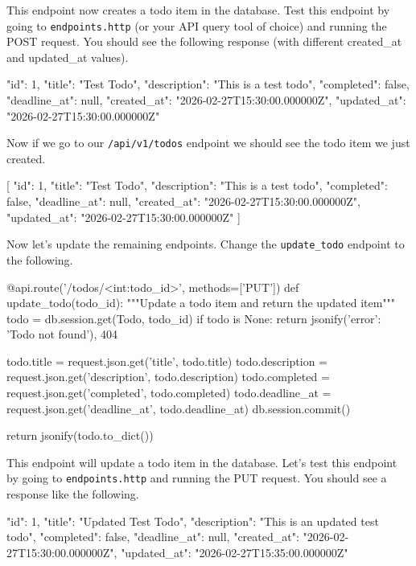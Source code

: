 \documentclass{csse4400}
\begin{document}
This endpoint now creates a todo item in the database.
Test this endpoint by going to \texttt{endpoints.http} (or your API query tool of choice) and running the POST request.
You should see the following response (with different created\_at and updated\_at values).

\begin{code}[language=json,numbers=none]{}
  {
    "id": 1,
    "title": "Test Todo",
    "description": "This is a test todo",
    "completed": false,
    "deadline_at": null,
    "created_at": "2026-02-27T15:30:00.000000Z",
    "updated_at": "2026-02-27T15:30:00.000000Z"
  }
\end{code}

Now if we go to our \texttt{/api/v1/todos} endpoint we should see the todo item we just created.

\begin{code}[language=json,numbers=none]{}
  [
    {
      "id": 1,
      "title": "Test Todo",
      "description": "This is a test todo",
      "completed": false,
      "deadline_at": null,
      "created_at": "2026-02-27T15:30:00.000000Z",
      "updated_at": "2026-02-27T15:30:00.000000Z"
    }
  ]
\end{code}

Now let's update the remaining endpoints.
Change the \texttt{update\_todo} endpoint to the following.

\begin{code}[language=python,numbers=none]{}
@api.route('/todos/<int:todo_id>', methods=['PUT'])
def update_todo(todo_id):
    """Update a todo item and return the updated item"""
    todo = db.session.get(Todo, todo_id)
    if todo is None:
        return jsonify({'error': 'Todo not found'}), 404

    todo.title = request.json.get('title', todo.title)
    todo.description = request.json.get('description', todo.description)
    todo.completed = request.json.get('completed', todo.completed)
    todo.deadline_at = request.json.get('deadline_at', todo.deadline_at)
    db.session.commit()

    return jsonify(todo.to_dict())
\end{code}

This endpoint will update a todo item in the database.
Let's test this endpoint by going to \texttt{endpoints.http} and running the PUT request.
You should see a response like the following.

\begin{code}[language=json,numbers=none]{}
  {
    "id": 1,
    "title": "Updated Test Todo",
    "description": "This is an updated test todo",
    "completed": false,
    "deadline_at": null,
    "created_at": "2026-02-27T15:30:00.000000Z",
    "updated_at": "2026-02-27T15:35:00.000000Z"
  }
\end{code}
\end{document}
